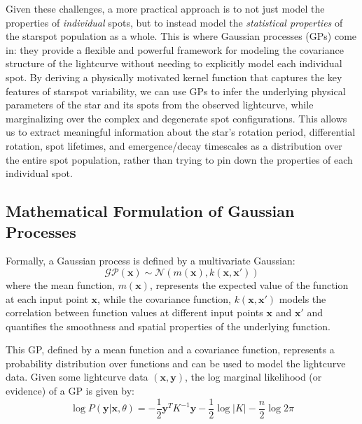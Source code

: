 \documentclass[preprint]{aastex702}
\begin{document}
Given these challenges, a more practical approach is to not just model the properties of \emph{individual} spots, but to instead model the \emph{statistical properties} of the starspot population as a whole. This is where Gaussian processes (GPs) come in: they provide a flexible and powerful framework for modeling the covariance structure of the lightcurve without needing to explicitly model each individual spot. By deriving a physically motivated kernel function that captures the key features of starspot variability, we can use GPs to infer the underlying physical parameters of the star and its spots from the observed lightcurve, while marginalizing over the complex and degenerate spot configurations. This allows us to extract meaningful information about the star's rotation period, differential rotation, spot lifetimes, and emergence/decay timescales as a distribution over the entire spot population, rather than trying to pin down the properties of each individual spot.

\subsection{Mathematical Formulation of Gaussian Processes}
Formally, a Gaussian process is defined by a multivariate Gaussian:
\begin{equation}
    \mathcal{GP}(\mathbf{x}) \sim \mathcal{N}(m(\mathbf{x}), k(\mathbf{x}, \mathbf{x}'))
\end{equation}
where the mean function, $m(\mathbf{x})$, represents the expected value of the function at each input point $\mathbf{x}$, while the covariance function, $k(\mathbf{x}, \mathbf{x}')$ models the correlation between function values at different input points $\mathbf{x}$ and $\mathbf{x}'$ and quantifies the smoothness and spatial properties of the underlying function. 

This GP, defined by a mean function and a covariance function, represents a probability distribution over functions and can be used to model the lightcurve data. Given some lightcurve data $(\mathbf{x}, \mathbf{y})$, the log marginal likelihood (or evidence) of a GP is given by:
\begin{equation} \label{eqn:marginal}
    \log P(\textbf{y} | \textbf{x}, \theta) = 
        -\frac{1}{2} \textbf{y}^T K^{-1} \textbf{y}
        -\frac{1}{2} \log \vert K \vert
        -\frac{n}{2} \log 2\pi
\end{equation}
\end{document}
